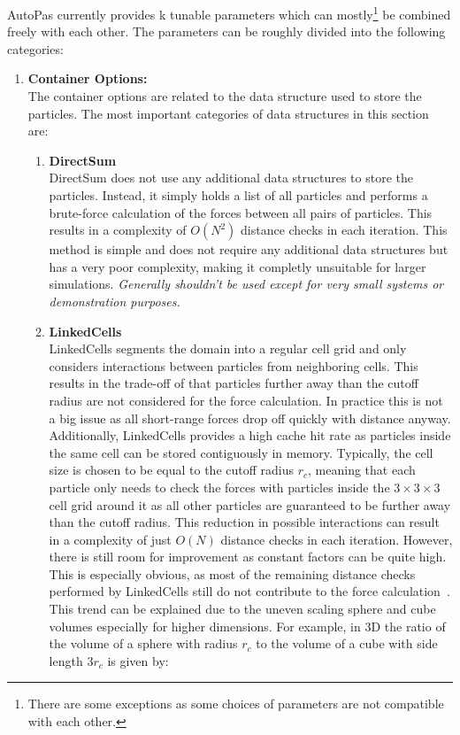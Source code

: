 AutoPas currently provides k  tunable parameters which can mostly\footnote{There are some exceptions as some choices of parameters are not compatible with each other.} be combined freely with each other. The parameters can be roughly divided into the following categories:

\begin{enumerate}[label=\textbf{\arabic*.}]
      \item \textbf{Container Options:} \\
            The container options are related to the data structure used to store the particles. The most important categories of data structures in this section are:
            \begin{enumerate}
                  \item \textbf{DirectSum} \\
                        DirectSum does not use any additional data structures to store the particles. Instead, it simply holds a list of all particles and performs a brute-force calculation of the forces between all pairs of particles. This results in a complexity of $O(N^2)$ distance checks in each iteration. This method is simple and does not require any additional data structures but has a very poor complexity, making it completly unsuitable for larger simulations. \textit{Generally shouldn't be used except for very small systems or demonstration purposes.~\cite{VICCIONE2008625}}
                  \item \textbf{LinkedCells} \\
                        LinkedCells segments the domain into a regular cell grid and only considers interactions between particles from neighboring cells. This results in the trade-off of that particles further away than the cutoff radius are not considered for the force calculation. In practice this is not a big issue as all short-range forces drop off quickly with distance anyway. Additionally, LinkedCells provides a high cache hit rate as particles inside the same cell can be stored contiguously in memory. Typically, the cell size is chosen to be equal to the cutoff radius $r_c$, meaning that each particle only needs to check the forces with particles inside the $3\times3\times3$ cell grid around it as all other particles are guaranteed to be further away than the cutoff radius. This reduction in possible interactions can result in a complexity of just $O(N)$ distance checks in each iteration. However, there is still room for improvement as constant factors can be quite high. This is especially obvious, as most of the remaining distance checks performed by LinkedCells still do not contribute to the force calculation~\cite{GRATL2019748}. This trend can be explained due to the uneven scaling sphere and cube volumes especially for higher dimensions. For example, in 3D the ratio of the volume of a sphere with radius $r_c$ to the volume of a cube with side length $3r_c$ is given by:


\end{enumerate}
\end{enumerate}
